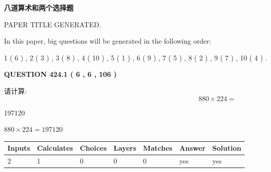 \documentclass{ctexart}
\begin{document}
   
\vspace{0.2in}
   
   
   
   
   
   
   
   
 \vspace{0.2in}
{\LARGE {\textbf{ 八道算术和两个选择题}}}
   
   
 PAPER TITLE GENERATED.
   
   
   
\vspace{0.2in}
   
In this paper, big questions will be generated in the following order: 
   
   
   1 ( 6 )
 ,
   2 ( 3 )
 ,
   3 ( 8 )
 ,
   4 ( 10 )
 ,
   5 ( 1 )
 ,
   6 ( 9 )
 ,
   7 ( 5 )
 ,
   8 ( 2 )
 ,
   9 ( 7 )
 ,
   10 ( 4 )
 .
  
\vspace{0.2in}
  
{\textbf{\Large{QUESTION
424.1 
 ( 6 , 6 , 106 )
}}}
  
  
 
请计算:
\begin{equation}
880  \times    %
224 = \nonumber
\end{equation}
 
 
 
\noindent{}
 
 

197120
 
 
\noindent{}
 
 

 
 
 
\noindent{}
 
 

$ %
880 \times  %
224=   %
197120$
 
 
\noindent{}
 
 

 
   
   
   
   
\noindent\begin{tabular}{|l|l|l|l|l|l|l|}
 \hline
Inputs & Calculates & Choices & Layers & Matches & Answer & Solution \\ \hline
 2  & 
 1  & 
 0
  & 
 0  & 
 0  & 
  yes & 
  yes 
  \\ \hline
 \end{tabular}
   
\end{document}
